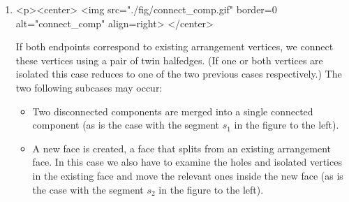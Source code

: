 \begin{enumerate}
\lcTex{%
  \setlength{\ArrangementTwoWidthRight}{4.1cm}
  \setlength{\ArrangementTwoWidthLeft}{\ArrangementTwoWidthLineReal}
  \addtolength{\ArrangementTwoWidthLeft}{-\ArrangementTwoWidthRight}
  \begin{minipage}{\ArrangementTwoWidthLeft}
}
\item
\begin{ccHtmlOnly}
  <p><center>
    <img src="./fig/connect_comp.gif" border=0 alt="connect_comp" align=right>
  </center>
\end{ccHtmlOnly}
If both endpoints correspond to existing arrangement
vertices, we connect these vertices using a pair of twin halfedges.
(If one or both vertices are isolated this case reduces to one of
the two previous cases respectively.) The two following subcases may
occur:
\begin{itemize}
\item Two disconnected components are merged into a single connected
component (as is the case with the segment $s_1$ in the figure to the
left).
%
\item A new face is created, a face that splits from an existing
arrangement face. In this case we also have to examine the holes and
isolated vertices in the existing face and move the relevant ones
inside the new face (as is the case with the segment $s_2$ in the
figure to the left).
\end{itemize}
\end{enumerate}

